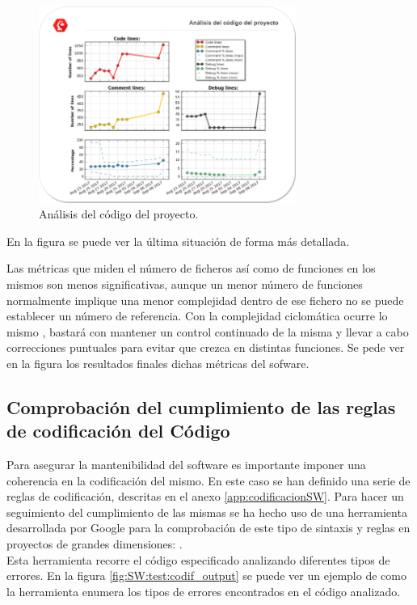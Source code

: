     \begin{figure}[H]
        \centering
        \includegraphics[width=0.75\textwidth]{figuras/Imagenes_SW/analisis_codigo.png}
        \caption{Análisis del código del proyecto. }
        \label{fig:SW:code_analysis}
    \end{figure}

    En la figura \completar se puede ver la última situación de forma más detallada.


    Las métricas que miden el número de ficheros así como de funciones en los mismos son menos significativas, aunque un menor número de funciones normalmente implique una menor complejidad dentro de ese fichero no se puede establecer un número de referencia. Con la complejidad ciclomática ocurre lo mismo , bastará con mantener un control continuado de la misma y llevar a cabo correcciones puntuales para evitar que crezca en distintas funciones. Se pede ver en la figura \completar los resultados finales dichas métricas del sofware.


    \subsection{Comprobación del cumplimiento de las reglas de codificación del Código}
        Para asegurar la mantenibilidad del software es importante imponer una coherencia en la codificación del mismo. En este caso se han definido una serie de reglas de codificación, descritas en el anexo \ref{app:codificacionSW}. Para hacer un seguimiento del cumplimiento de las mismas se ha hecho uso de una herramienta desarrollada por Google para la comprobación de este tipo de sintaxis y reglas en proyectos de grandes dimensiones: .
        \\
        Esta herramienta recorre el código especificado analizando diferentes tipos de errores. En la figura \ref{fig:SW:test:codif_output} se puede ver un ejemplo de como la herramienta enumera los tipos de errores encontrados en el código analizado.

